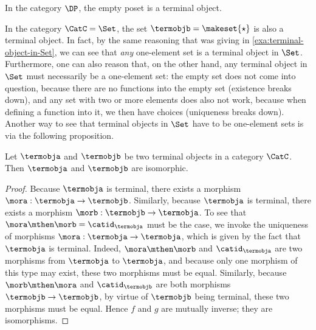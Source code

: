 \begin{example}\label{exa:term-obj-DP}
In the category $\DP$, the empty poset is a terminal object.
\end{example}

\begin{remark}\label{rem:terminal-object-renaming}
In the category $\CatC = \Set$, the set $\termobjb = \makeset{ \star}$ is also a terminal object. In fact, by the same reasoning that was giving in \cref{exa:terminal-object-in-Set}, we can see that \emph{any} one-element set is a terminal object in $\Set$. Furthermore, one can also reason that, on the other hand, any terminal object in $\Set$ must necessarily be a one-element set: the empty set does not come into question, because there are no functions into the empty set (existence breaks down), and any set with two or more elements does also not work, because when defining a function into it, we then have choices (uniqueness breaks down). Another way to see that terminal objects in $\Set$ have to be one-element sets is via the following proposition. 
\end{remark}

\begin{proposition}\label{prop:terminal-objs-isom}
Let $\termobja$ and $\termobjb$ be two terminal objects in a category $\CatC$.  Then $\termobja$ and $\termobjb$ are isomorphic.  
\end{proposition}

\begin{proof}
Because $\termobja$ is terminal, there exists a morphism $\mora : \termobja \to \termobjb$. Similarly, because $\termobja$ is terminal, there exists a morphism $\morb : \termobjb \to \termobja$. To see that $\mora \mthen \morb = \catid_\termobja$ must be the case, we invoke the uniqueness of morphisms $\mora : \termobja \to \termobja$, which is given by the fact that $\termobja$ is terminal. Indeed, $\mora \mthen \morb$ and $\catid_\termobja$ are two morphisms from $\termobja$ to $\termobja$, and because only one morphism of this type may exist, these two morphisms must be equal. Similarly, because $\morb \mthen \mora$ and $\catid_\termobjb$ are both morphisms $\termobjb \to \termobjb$, by virtue of $\termobjb$ being terminal, these two morphisms must be equal. Hence $f$ and $g$ are mutually inverse; they are isomorphisms. 
\end{proof}


